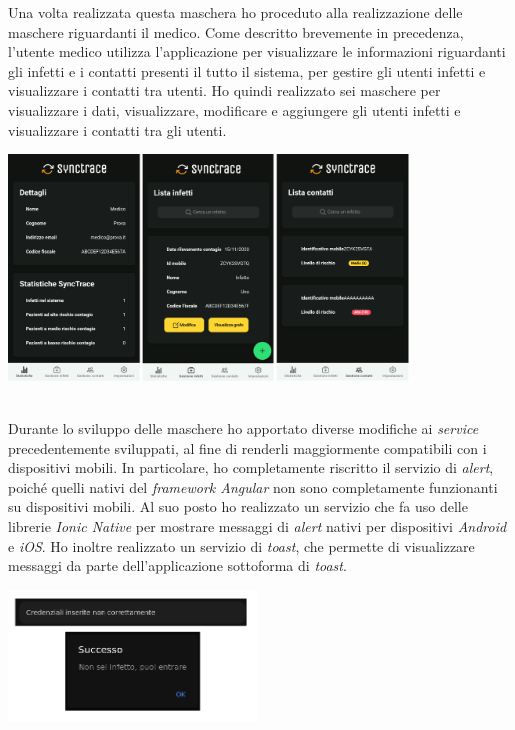 Una volta realizzata questa maschera ho proceduto alla realizzazione delle maschere riguardanti il medico. Come descritto brevemente in precedenza, l'utente medico utilizza l'applicazione per visualizzare le informazioni riguardanti gli infetti e i contatti presenti il tutto il sistema, per gestire gli utenti infetti e visualizzare i contatti tra utenti. Ho quindi realizzato sei maschere per visualizzare i dati, visualizzare, modificare e aggiungere gli utenti infetti e visualizzare i contatti tra gli utenti. \\

\begin{minipage}{\linewidth}
  \centering
    \includegraphics[height=6cm]{immagini/app/med}
\end{minipage}\\

Durante lo sviluppo delle maschere ho apportato diverse modifiche ai \textit{service} precedentemente sviluppati, al fine di renderli maggiormente compatibili con i dispositivi mobili. In particolare, ho completamente riscritto il servizio di \textit{alert}, poiché quelli nativi del \textit{framework Angular} non sono completamente funzionanti su dispositivi mobili. Al suo posto ho realizzato un servizio che fa uso delle librerie \textit{Ionic Native} per mostrare messaggi di \textit{alert} nativi per dispositivi \textit{Android} e \textit{iOS}. Ho inoltre realizzato un servizio di \textit{toast}, che permette di visualizzare messaggi da parte dell'applicazione sottoforma di \textit{toast}. \\

\begin{minipage}{\linewidth}
  \centering
    \includegraphics[height=3.5cm]{immagini/app/alert}
\end{minipage} \\

